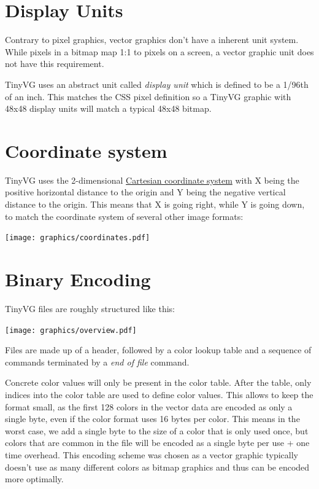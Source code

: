 \documentclass[]{article}
\begin{document}
\hypertarget{display-units}{\section{Display Units}\label{display-units}}

Contrary to pixel graphics, vector graphics don't have a inherent unit system. While pixels in a bitmap map 1:1 to pixels on a screen, a vector graphic unit does not have this requirement.

TinyVG uses an abstract unit called \emph{display unit} which is defined to be a 1/96th of an inch. This matches the CSS pixel definition so a TinyVG graphic with 48x48 display units will match a typical 48x48 bitmap. 

\hypertarget{coordinate-system}{\section{Coordinate system}\label{coordinate-system}}

TinyVG uses the 2-dimensional \href{https://en.wikipedia.org/wiki/Cartesian_coordinate_system}{Cartesian
coordinate system} with X being the positive horizontal distance to the
origin and Y being the negative vertical distance to the origin. This
means that X is going right, while Y is going down, to match the
coordinate system of several other image formats:

\begin{center}
  \texttt{[image: graphics/coordinates.pdf]}
\end{center}

\hypertarget{binary-encoding}{\section{Binary Encoding}\label{binary-encoding}}

TinyVG files are roughly structured like this:

\begin{center}
\texttt{[image: graphics/overview.pdf]}
\end{center}

Files are made up of a header, followed by a color lookup table and a
sequence of commands terminated by a \emph{end of file} command.

Concrete color values will only be present in the color table. After the
table, only indices into the color table are used to define color
values. This allows to keep the format small, as the first 128 colors in
the vector data are encoded as only a single byte, even if the color
format uses 16 bytes per color. This means in the worst case, we add a
single byte to the size of a color that is only used once, but colors
that are common in the file will be encoded as a single byte per use +
one time overhead. This encoding scheme was chosen as a vector graphic
typically doesn't use as many different colors as bitmap graphics and
thus can be encoded more optimally.
\end{document}
